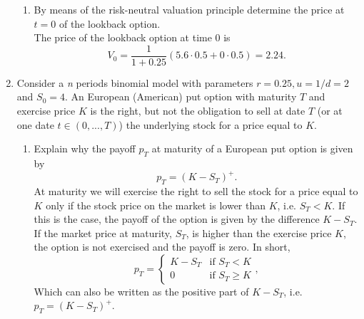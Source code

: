 \documentclass[11pt,a4,table]{article}
\begin{document}
\begin{enumerate}
\begin{enumerate}
        \item By means of the risk-neutral valuation principle determine the price at $t=0$ of the lookback option.\\
        The price of the lookback option at time 0 is
        \begin{equation*}
            V_0 = \frac{1}{1+0.25}(5.6\cdot 0.5 + 0\cdot 0.5) = 2.24.
        \end{equation*}
    \end{enumerate}
    
    
    \item Consider a \textit{n} periods binomial model with parameters $r=0.25, u=1/d=2$ and $S_0=4$. An European (American) put option with maturity $T$ and exercise price $K$ is the right, but not the obligation to sell at date $T$ (or at one date $t\in(0,...,T)$) the underlying stock for a price equal to $K$.
    
    \begin{enumerate}
        \item Explain why the payoff $p_T$ at maturity of a European put option is given by
        \begin{equation*}
            p_T=(K-S_T)^+.
        \end{equation*}
        At maturity we will exercise the right to sell the stock for a price equal to $K$ only if the stock price on the market is lower than $K$, i.e. $S_T < K$. If this is the case, the payoff of the option is given by the difference $K-S_T$. If the market price at maturity, $S_T$, is higher than the exercise price $K$, the option is not exercised and the payoff is zero. In short,
        \begin{equation*}
            p_T=    \begin{cases}
                        K-S_T   & \text{if $S_T < K$} \\
                        0       & \text{if $S_T \geq K$}
                    \end{cases},       
        \end{equation*}
        Which can also be written as the positive part of $K-S_T$, i.e. $p_T=(K-S_T)^+$.
        

\end{enumerate}
\end{enumerate}
\end{document}
